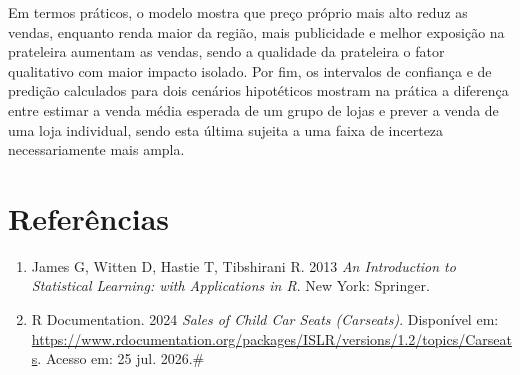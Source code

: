 \documentclass[a4paper]{modeloUFCG} %
\begin{document}
Em termos práticos, o modelo mostra que preço próprio mais alto reduz as vendas, enquanto renda maior da região, mais publicidade e melhor exposição na prateleira aumentam as vendas, sendo a qualidade da prateleira o fator qualitativo com maior impacto isolado. Por fim, os intervalos de confiança e de predição calculados para dois cenários hipotéticos mostram na prática a diferença entre estimar a venda média esperada de um grupo de lojas e prever a venda de uma loja individual, sendo esta última sujeita a uma faixa de incerteza necessariamente mais ampla.

\section{Referências}\label{referuxeancias}

\begin{enumerate}
\def\labelenumi{\arabic{enumi}.}
\tightlist
\item
  James G, Witten D, Hastie T, Tibshirani R. 2013 \emph{An Introduction to Statistical Learning: with Applications in R}. New York: Springer.
\item
  R Documentation. 2024 \emph{Sales of Child Car Seats (Carseats)}. Disponível em: \url{https://www.rdocumentation.org/packages/ISLR/versions/1.2/topics/Carseats}. Acesso em: 25 jul. 2026.\#
\end{enumerate}









\end{document}
